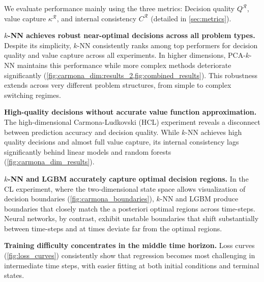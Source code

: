 \documentclass[11pt,reqno,a4paper]{amsart}
\theoremstyle{definition}
\numberwithin{equation}{section}
\DeclareMathOperator{\1}{\mathbbm{1}}
\begin{document}
We evaluate performance mainly using the three metrics: Decision quality $Q^\mathcal{R}$, value capture $\kappa^\mathcal{R}$, and internal consistency $C^\mathcal{R}$ (detailed in \cref{sec:metrics}).

\textbf{$k$-NN achieves robust near-optimal decisions across all problem types.} Despite its simplicity, $k$-NN consistently ranks among top performers for decision quality and value capture across all experiments. In higher dimensions, PCA-$k$-NN maintains this performance while more complex methods deteriorate significantly (\cref{fig:carmona_dim:results_2,fig:combined_results}). This robustness extends across very different problem structures, from simple to complex switching regimes.

\textbf{High-quality decisions without accurate value function approximation.} The high-dimensional Carmona-Ludkovski (HCL) experiment reveals a disconnect between prediction accuracy and decision quality. While $k$-NN achieves high quality decisions and almost full value capture, its internal consistency lags significantly behind linear models and random forests (\cref{fig:carmona_dim_results}).

\textbf{$k$-NN and LGBM accurately capture optimal decision regions.}
In the CL experiment, where the two-dimensional state space allows visualization of decision boundaries (\cref{fig:carmona_boundaries}), $k$-NN and LGBM produce boundaries that closely match the a posteriori optimal regions across time-steps. Neural networks, by contrast, exhibit unstable boundaries that shift substantially between time-steps and at times deviate far from the optimal regions.

\textbf{Training difficulty concentrates in the middle time horizon.} Loss curves (\cref{fig:loss_curves}) consistently show that regression becomes most challenging in intermediate time steps, with easier fitting at both initial conditions and terminal states.
\end{document}
